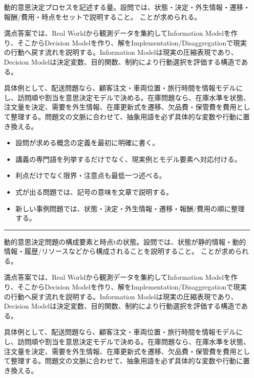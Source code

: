 \clearpage{}
動的意思決定プロセスを記述する量。設問では、状態・決定・外生情報・遷移・報酬/費用・時点をセットで説明すること。 ことが求められる。\par
{}
満点答案では、Real Worldから観測データを集約してInformation Modelを作り、そこからDecision Modelを作り、解をImplementation/Disaggregationで現実の行動へ戻す流れを説明する。Information Modelは現実の圧縮表現であり、Decision Modelは決定変数、目的関数、制約により行動選択を評価する構造である。\par
{}
具体例として、配送問題なら、顧客注文・車両位置・旅行時間を情報モデルにし、訪問順や割当を意思決定モデルで決める。在庫問題なら、在庫水準を状態、注文量を決定、需要を外生情報、在庫更新式を遷移、欠品費・保管費を費用として整理する。問題文の文脈に合わせて、抽象用語を必ず具体的な変数や行動に置き換える。\par
{}
\begin{itemize}
\item 設問が求める概念の定義を最初に明確に書く。
\item 講義の専門語を列挙するだけでなく、現実例とモデル要素へ対応付ける。
\item 利点だけでなく限界・注意点も最低一つ述べる。
\item 式が出る問題では、記号の意味を文章で説明する。
\item 新しい事例問題では、状態・決定・外生情報・遷移・報酬/費用の順に整理する。
\end{itemize}
\vspace{2mm}\hrule\vspace{2mm}
動的意思決定問題の構成要素と時点tの状態。設問では、状態が静的情報・動的情報・履歴/リソースなどから構成されることを説明すること。 ことが求められる。\par
{}
満点答案では、Real Worldから観測データを集約してInformation Modelを作り、そこからDecision Modelを作り、解をImplementation/Disaggregationで現実の行動へ戻す流れを説明する。Information Modelは現実の圧縮表現であり、Decision Modelは決定変数、目的関数、制約により行動選択を評価する構造である。\par
{}
具体例として、配送問題なら、顧客注文・車両位置・旅行時間を情報モデルにし、訪問順や割当を意思決定モデルで決める。在庫問題なら、在庫水準を状態、注文量を決定、需要を外生情報、在庫更新式を遷移、欠品費・保管費を費用として整理する。問題文の文脈に合わせて、抽象用語を必ず具体的な変数や行動に置き換える。\par

